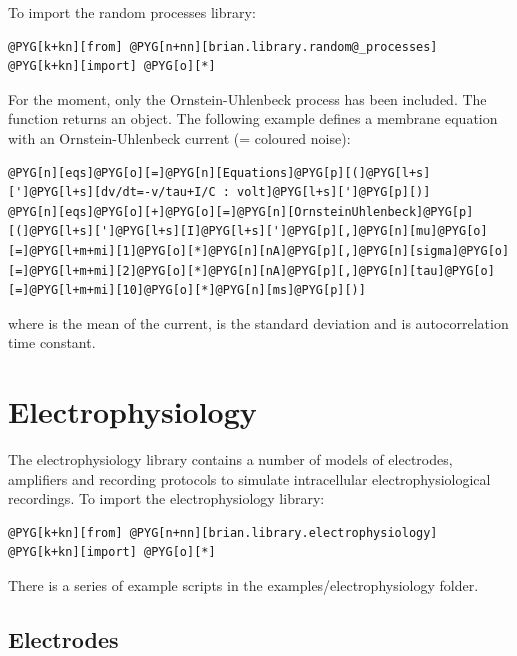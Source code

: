 \documentclass[letterpaper,10pt,english]{manual}
\begin{document}
To import the random processes library:

\begin{Verbatim}[commandchars=@\[\]]
@PYG[k+kn][from] @PYG[n+nn][brian.library.random@_processes] @PYG[k+kn][import] @PYG[o][*]
\end{Verbatim}

For the moment, only the Ornstein-Uhlenbeck process has been included.
The function  returns an \hyperlink{brian.Equations}{} object. The following example
defines a membrane equation with an Ornstein-Uhlenbeck current  (= coloured noise):

\begin{Verbatim}[commandchars=@\[\]]
@PYG[n][eqs]@PYG[o][=]@PYG[n][Equations]@PYG[p][(]@PYG[l+s][']@PYG[l+s][dv/dt=-v/tau+I/C : volt]@PYG[l+s][']@PYG[p][)]
@PYG[n][eqs]@PYG[o][+]@PYG[o][=]@PYG[n][OrnsteinUhlenbeck]@PYG[p][(]@PYG[l+s][']@PYG[l+s][I]@PYG[l+s][']@PYG[p][,]@PYG[n][mu]@PYG[o][=]@PYG[l+m+mi][1]@PYG[o][*]@PYG[n][nA]@PYG[p][,]@PYG[n][sigma]@PYG[o][=]@PYG[l+m+mi][2]@PYG[o][*]@PYG[n][nA]@PYG[p][,]@PYG[n][tau]@PYG[o][=]@PYG[l+m+mi][10]@PYG[o][*]@PYG[n][ms]@PYG[p][)]
\end{Verbatim}

where  is the mean of the current,  is the standard deviation and
 is autocorrelation time constant.

\resetcurrentobjects
\hypertarget{--doc-electrophysiology}{}

\section{Electrophysiology}

The electrophysiology library contains a number of models of electrodes,
amplifiers and recording protocols to simulate intracellular electrophysiological
recordings.
To import the electrophysiology library:

\begin{Verbatim}[commandchars=@\[\]]
@PYG[k+kn][from] @PYG[n+nn][brian.library.electrophysiology] @PYG[k+kn][import] @PYG[o][*]
\end{Verbatim}

There is a series of example scripts in the examples/electrophysiology folder.


\subsection{Electrodes}
\end{document}
